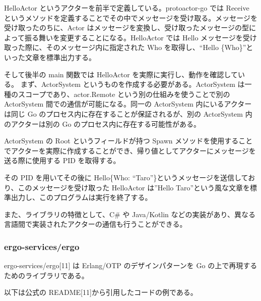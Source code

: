 HelloActor というアクターを前半で定義している。protoactor-go では
Receive
というメソッドを定義することでその中でメッセージを受け取る。メッセージを受け取ったのちに、Actor
はメッセージを変換し、受け取ったメッセージの型によって振る舞いを変更することになる。HelloActor
では Hello メッセージを受け取った際に、そのメッセージ内に指定された Who
を取得し、``Hello \{Who\}''といった文章を標準出力する。

そして後半の main 関数では HelloActor
を実際に実行し、動作を確認している。 まず、ActorSystem
というものを作成する必要がある。ActorSystem
は一種のスコープであり、actor.Remote という別の仕組みを使うことで別の
ActorSystem 間での通信が可能になる。同一の ActorSystem
内にいるアクターは同じ Go のプロセス内に存在することが保証されるが、別の
ActorSystem 内のアクターは別の Go のプロセス内に存在する可能性がある。

ActorSystem の Root というフィールドが持つ Spawn
メソッドを使用することでアクターを実際に作成することができ、帰り値としてアクターにメッセージを送る際に使用する
PID を取得する。

その PID を用いてその後に Hello\{Who:
``Taro''\}というメッセージを送信しており、このメッセージを受け取った
HelloActor は''Hello
Taro''という風な文章を標準出力し、このプログラムは実行を終了する。

また、ライブラリの特徴として、C\# や Java/Kotlin
などの実装があり、異なる言語間で実装されたアクターの通信も行うことができる。

\subsubsection{ergo-services/ergo}

ergo-services/ergo{[}11{]} は Erlang/OTP のデザインパターンを Go
の上で再現するためのライブラリである。

以下は公式の README{[}11{]}から引用したコードの例である。

